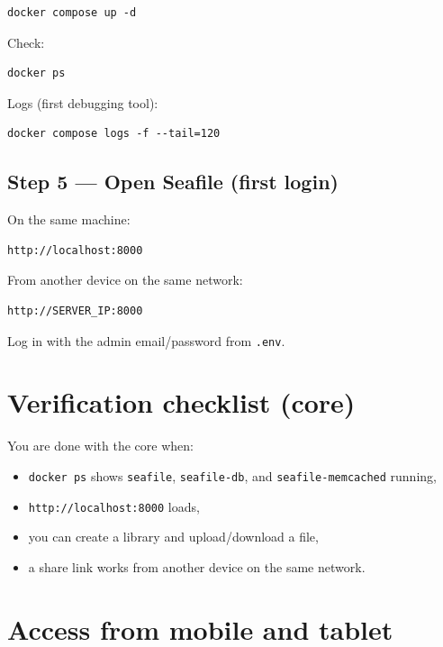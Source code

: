\begin{lstlisting}
docker compose up -d
\end{lstlisting}

Check:

\begin{lstlisting}
docker ps
\end{lstlisting}

Logs (first debugging tool):

\begin{lstlisting}
docker compose logs -f --tail=120
\end{lstlisting}

\subsection{Step 5 --- Open Seafile (first login)}
On the same machine:

\begin{lstlisting}
http://localhost:8000
\end{lstlisting}

From another device on the same network:

\begin{lstlisting}
http://SERVER_IP:8000
\end{lstlisting}

Log in with the admin email/password from \texttt{.env}.


\section{Verification checklist (core)}
\label{sec:sf_core_verify}
You are done with the core when:
\begin{itemize}[leftmargin=*]
  \item \texttt{docker ps} shows \texttt{seafile}, \texttt{seafile-db}, and \texttt{seafile-memcached} running,
  \item \texttt{http://localhost:8000} loads,
  \item you can create a library and upload/download a file,
  \item a share link works from another device on the same network.
\end{itemize}

\section{Access from mobile and tablet}
